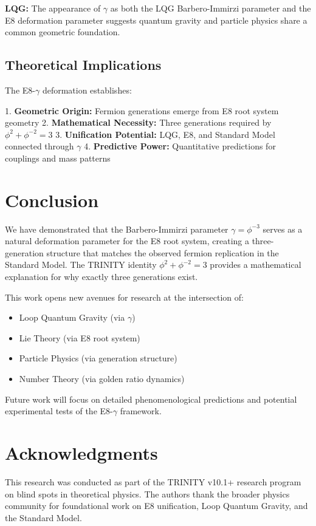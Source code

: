 \documentclass[12pt,a4paper]{article}
\begin{document}
\textbf{LQG:} The appearance of $\gamma$ as both the LQG Barbero-Immirzi parameter and the E8 deformation parameter suggests quantum gravity and particle physics share a common geometric foundation.

\subsection{Theoretical Implications}

The E8-$\gamma$ deformation establishes:

1. \textbf{Geometric Origin:} Fermion generations emerge from E8 root system geometry
2. \textbf{Mathematical Necessity:} Three generations required by $\phi^2 + \phi^{-2} = 3$
3. \textbf{Unification Potential:} LQG, E8, and Standard Model connected through $\gamma$
4. \textbf{Predictive Power:} Quantitative predictions for couplings and mass patterns

\section{Conclusion}

We have demonstrated that the Barbero-Immirzi parameter $\gamma = \phi^{-3}$ serves as a natural deformation parameter for the E8 root system, creating a three-generation structure that matches the observed fermion replication in the Standard Model. The TRINITY identity $\phi^2 + \phi^{-2} = 3$ provides a mathematical explanation for why exactly three generations exist.

This work opens new avenues for research at the intersection of:
\begin{itemize}
\item Loop Quantum Gravity (via $\gamma$)
\item Lie Theory (via E8 root system)
\item Particle Physics (via generation structure)
\item Number Theory (via golden ratio dynamics)
\end{itemize}

Future work will focus on detailed phenomenological predictions and potential experimental tests of the E8-$\gamma$ framework.

\section*{Acknowledgments}

This research was conducted as part of the TRINITY v10.1+ research program on blind spots in theoretical physics. The authors thank the broader physics community for foundational work on E8 unification, Loop Quantum Gravity, and the Standard Model.
\end{document}
